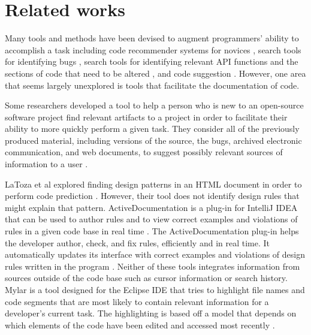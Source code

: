 \documentclass[12pt]{article}
\begin{document}
\clearpage


\section{Related works}\label{relatedWorks}

Many tools and methods have been devised to augment programmers' ability to accomplish a task including code recommender systems for novices \cite{HartmannEtAl2010}, search tools for identifying bugs \cite{HovemeyerPugh2004}, search tools for identifying relevant API functions and the sections of code that need to be altered \cite{RongEtAl2016}, and code suggestion \cite{RaychevEtAl2014}. However, one area that seems largely unexplored is tools that facilitate the documentation of code.

Some researchers developed a tool to help a person who is new to an open-source software project find relevant artifacts to a project in order to facilitate their ability to more quickly perform a given task. They consider all of the previously produced material, including versions of the source, the bugs, archived electronic communication, and web documents, to suggest possibly relevant sources of information to a user \cite{CubranicMurphy2003}.

LaToza et al explored finding design patterns in an HTML document in order to perform code prediction \cite{LaTozaEtAl2019}. However, their tool does not identify design rules that might explain that pattern. 
ActiveDocumentation is a plug-in for IntelliJ IDEA that can be used to author rules and to view correct examples and violations of rules in a given code base in real time \cite{MehrpurEtAl2019}. The ActiveDocumentation plug-in helps the developer author, check, and fix rules, efficiently and in real time. It automatically updates its interface with correct examples and violations of design rules written in the program \cite{MehrpurEtAl2019}. Neither of these tools integrates information from sources outside of the code base such as cursor information or search history. Mylar is a tool designed for the Eclipse IDE that tries to highlight file names and code segments that are most likely to contain relevant information for a developer's current task. The highlighting is based off a model that depends on which elements of the code have been edited and accessed most recently \cite{KerstenMurphy2005}.




\clearpage
\end{document}
